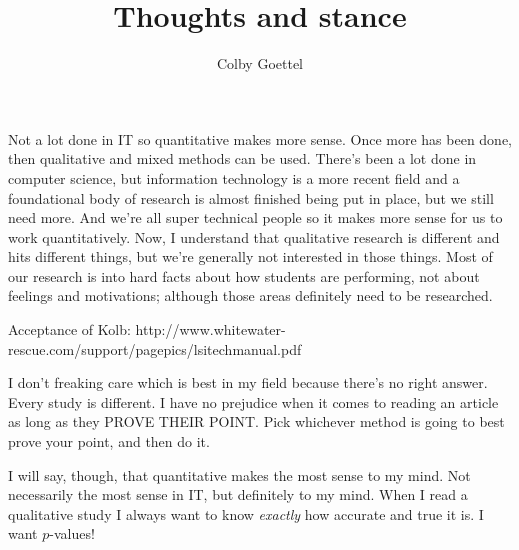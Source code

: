 \documentclass[man,natbib]{apa6}
\title{Thoughts and stance}
\author{Colby Goettel}
\affiliation{Brigham Young University}
\begin{document}
\maketitle




Not a lot done in IT so quantitative makes more sense. Once more has been done, then qualitative and mixed methods can be used. There's been a lot done in computer science, but information technology is a more recent field and a foundational body of research is almost finished being put in place, but we still need more. And we're all super technical people so it makes more sense for us to work quantitatively. Now, I understand that qualitative research is different and hits different things, but we're generally not interested in those things. Most of our research is into hard facts about how students are performing, not about feelings and motivations; although those areas definitely need to be researched.

Acceptance of Kolb: http://www.whitewater-rescue.com/support/pagepics/lsitechmanual.pdf

I don't freaking care which is best in my field because there's no right answer. Every study is different. I have no prejudice when it comes to reading an article as long as they PROVE THEIR POINT. Pick whichever method is going to best prove your point, and then do it.

I will say, though, that quantitative makes the most sense to my mind. Not necessarily the most sense in IT, but definitely to my mind. When I read a qualitative study I always want to know \emph{exactly} how accurate and true it is. I want $p$-values!
\end{document}
